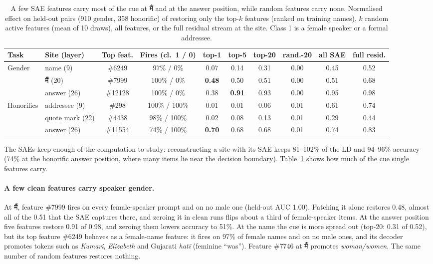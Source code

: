 \documentclass[11pt]{article}
\newcommand{\hi}[1]{{\devfont #1}}
\newcommand{\main}{\hi{मैं}}  %
\begin{document}
\begin{table}[t]
\centering\small
\setlength{\tabcolsep}{4.2pt}
\begin{tabular}{llcccccccc}
\toprule
Task & Site (layer) & Top feat. & Fires (cl.\ 1 / 0) & top-1 & top-5 & top-20 & rand.-20 & all SAE & full resid. \\
\midrule
Gender & name (9) & \#6249 & 97\% / 0\% & 0.07 & 0.14 & 0.31 & 0.00 & 0.45 & 0.52 \\
 & \main{} (20) & \#7999 & 100\% / 0\% & \textbf{0.48} & 0.50 & 0.51 & 0.00 & 0.51 & 0.68 \\
 & answer (26) & \#12128 & 100\% / 0\% & 0.38 & \textbf{0.91} & 0.93 & 0.00 & 0.95 & 0.98 \\
Honorifics & addressee (9) & \#298 & 100\% / 100\% & 0.01 & 0.01 & 0.06 & 0.01 & 0.61 & 0.74 \\
 & quote mark (22) & \#4438 & 98\% / 100\% & 0.02 & 0.08 & 0.13 & 0.01 & 0.29 & 0.44 \\
 & answer (26) & \#11554 & 74\% / 100\% & \textbf{0.70} & 0.68 & 0.68 & 0.01 & 0.74 & 0.83 \\
\bottomrule
\end{tabular}
\caption{A few SAE features carry most of the cue at \main{} and at the answer position, while random features carry none. Normalised effect on held-out pairs (910 gender, 358 honorific) of restoring only the top-$k$ features (ranked on training names), $k$ random active features (mean of 10 draws), all features, or the full residual stream at the site. Class 1 is a female speaker or a formal addressee.}
\label{tab:sae}
\end{table}

The SAEs keep enough of the computation to study: reconstructing a site with its SAE keeps 81--102\% of the LD and 94--96\% accuracy (74\% at the honorific answer position, where many items lie near the decision boundary). Table~\ref{tab:sae} shows how much of the cue single features carry.

\paragraph{A few clean features carry speaker gender.} At \main{}, feature \#7999 fires on every female-speaker prompt and on no male one (held-out AUC 1.00). Patching it alone restores 0.48, almost all of the 0.51 that the SAE captures there, and zeroing it in clean runs flips about a third of female-speaker items. At the answer position five features restore 0.91 of 0.98, and zeroing them lowers accuracy to 51\%. At the name the cue is more spread out (top-20: 0.31 of 0.52), but its top feature \#6249 behaves as a female-name feature: it fires on 97\% of female names and on no male ones, and its decoder promotes tokens such as \emph{Kumari}, \emph{Elizabeth} and Gujarati \emph{hatī} (feminine ``was''). Feature \#7746 at \main{} promotes \emph{woman/women}. The same number of random features restores nothing.
\end{document}
